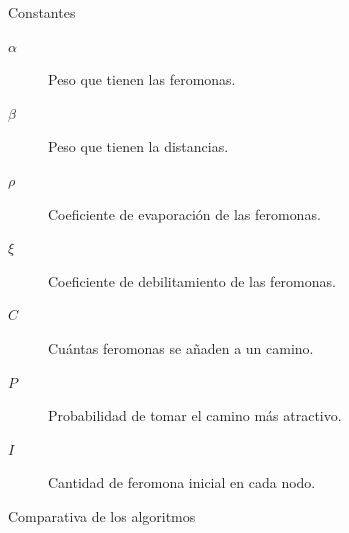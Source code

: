 \begin{frame}{Constantes}
\begin{description}
  \item[$\alpha$] Peso que tienen las feromonas.
  \item[$\beta$] Peso que tienen la distancias.
  \item[$\rho$] Coeficiente de evaporación de las feromonas.
  \item[$\xi$] Coeficiente de debilitamiento de las feromonas.
  \item[$C$] Cuántas feromonas se añaden a un camino.
  \item[$P$] Probabilidad de tomar el camino más atractivo.
  \item[$I$] Cantidad de feromona inicial en cada nodo.
\end{description}
\end{frame}

\begin{frame}{Comparativa de los algoritmos}
\end{frame}
